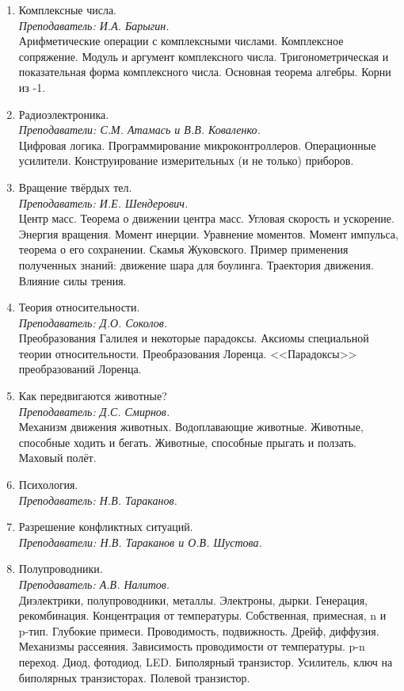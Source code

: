\documentclass[12pt]{article}
\newlength{\h}
\newlength{\x}
\begin{document}
\begin{enumerate}
\item Комплексные числа.\\[0.2cm]
  \textit{Преподаватель: И.А. Барыгин.}\\[0.2cm]
  Арифметические операции с комплексными числами. Комплексное
  сопряжение. Модуль и аргумент комплексного числа. Тригонометрическая
  и показательная форма комплексного числа. Основная теорема
  алгебры. Корни из -1.
\item Радиоэлектроника. \\[0.2cm]
  \textit{Преподаватели: С.М. Атамась и В.В. Коваленко.}\\[0.2cm]
  Цифровая логика. Программирование микроконтроллеров. Операционные
  усилители. Конструирование измерительных (и не только) приборов. 

\item Вращение твёрдых тел. \\[0.2cm]
  \textit{Преподаватель: И.Е. Шендерович.}\\[0.2cm]
  Центр масс. Теорема о движении центра масс. Угловая скорость и
  ускорение. Энергия вращения. Момент инерции. Уравнение
  моментов. Момент импульса, теорема о его сохранении. Скамья
  Жуковского. Пример применения полученных знаний: движение шара для
  боулинга. Траектория движения. Влияние силы трения. 
\item Теория относительности. \\[0.2cm]
  \textit{Преподаватель: Д.О. Соколов.}\\[0.2cm]
  Преобразования Галилея и некоторые парадоксы. Аксиомы специальной
  теории относительности. Преобразования Лоренца. <<Парадоксы>>
  преобразований Лоренца. 
\item Как передвигаются животные? \\[0.2cm]
  \textit{Преподаватель: Д.С. Смирнов.}\\[0.2cm]
  Механизм движения животных. Водоплавающие животные. Животные,
  способные ходить и бегать. Животные, способные прыгать и
  ползать. Маховый полёт.
\item Психология. \\[0.2cm]
  \textit{Преподаватель: Н.В. Тараканов.}
\item Разрешение конфликтных ситуаций. \\[0.2cm]
  \textit{Преподаватели: Н.В. Тараканов и О.В. Шустова.}
\item Полупроводники. \\[0.2cm]
  \textit{Преподаватель: А.В. Налитов. }\\[0.2cm]
  Диэлектрики, полупроводники, металлы. Электроны, дырки. Генерация,
  рекомбинация. Концентрация от температуры. Собственная, примесная, n
  и p-тип. Глубокие примеси. Проводимость, подвижность. Дрейф,
  диффузия. Механизмы рассеяния. Зависимость проводимости от
  температуры. p-n переход. Диод, фотодиод, LED. Биполярный
  транзистор. Усилитель, ключ на биполярных транзисторах. Полевой
  транзистор.
\end{enumerate}
\end{document}
